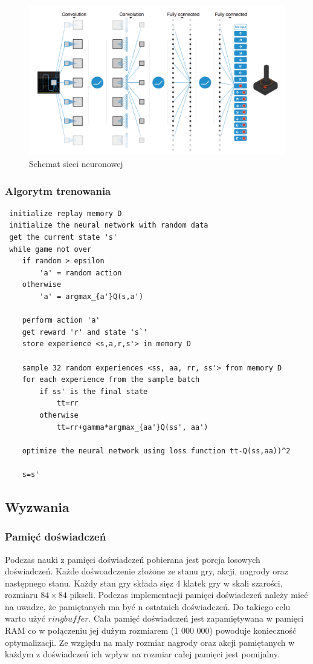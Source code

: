 \documentclass[12pt]{article}
\begin{document}
\begin{figure}[H]
\centering \includegraphics[scale=0.3]{network.png}
\caption{Schemat sieci neuronowej \cite{deepmind_2}}
\label{simple1}
\end{figure}

\subsubsection{Algorytm trenowania}

\begin{lstlisting}
 initialize replay memory D
 initialize the neural network with random data
 get the current state 's'
 while game not over
 	if random > epsilon 
 		'a' = random action
 	otherwise
 		'a' = argmax_{a'}Q(s,a')

	perform action 'a'
	get reward 'r' and state 's`'
	store experience <s,a,r,s'> in memory D
	
	sample 32 random experiences <ss, aa, rr, ss'> from memory D
	for each experience from the sample batch
		if ss' is the final state 
			tt=rr
		otherwise
			tt=rr+gamma*argmax_{aa'}Q(ss', aa')
	
	optimize the neural network using loss function tt-Q(ss,aa))^2
	
	s=s'
\end{lstlisting}

\newpage

\subsection{Wyzwania}
\subsubsection{Pamięć doświadczeń}
Podczas nauki z pamięci doświadczeń pobierana jest porcja losowych doświadczeń. Każde dośwoadczenie złożone ze stanu gry, akcji, nagrody oraz następnego stanu. Każdy stan gry składa sięz 4 klatek gry w skali szarości, rozmiaru $84\times84$ pikseli. Podczas implementacji pamięci doświadczeń należy mieć na uwadze, że pamiętanych ma być n ostatnich doświadczeń. Do takiego celu warto użyć $ring buffer$. Cała pamięć doświadczeń jest zapamiętywana w pamięci RAM co w połączeniu jej dużym rozmiarem (1 000 000) powoduje konieczność optymalizacji. Ze względu na mały rozmiar nagrody oraz akcji pamiętanych w każdym z doświadczeń ich wpływ na rozmiar całej pamięci jest pomijalny.
\end{document}
